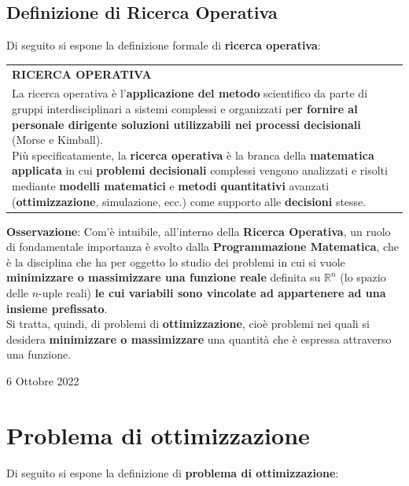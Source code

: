 \documentclass[a4paper]{extarticle}
\renewcommand\arraystretch{}
\begin{document}
\vspace{1em}
\noindent
\subsection{Definizione di Ricerca Operativa}
Di seguito si espone la definizione formale di \textbf{ricerca operativa}:

\vspace{1em}
\setlength{\tabcolsep}{14pt}
\renewcommand{\arraystretch}{2}
\noindent
\begin{tabularx}{\textwidth}{@{}|P|@{}}
    \hline
    {\textbf{RICERCA OPERATIVA}}\\
    \parbox{\linewidth}{La ricerca operativa è l'\textbf{applicazione del metodo} scientifico da parte di gruppi interdisciplinari a sistemi complessi e organizzati p\textbf{er fornire al personale dirigente soluzioni utilizzabili nei processi decisionali} (Morse e Kimball).\\
    Più specificatamente, la \textbf{ricerca operativa} è la branca della \textbf{matematica applicata} in cui \textbf{problemi decisionali} complessi vengono analizzati e risolti mediante \textbf{modelli matematici} e \textbf{metodi quantitativi} avanzati (\textbf{ottimizzazione}, simulazione, ecc.) come supporto alle \textbf{decisioni} stesse. \vspace{3mm}}\\
    \hline
\end{tabularx}

\vspace{2em}
\noindent
\textbf{Osservazione}: Com'è intuibile, all'interno della \textbf{Ricerca Operativa}, un ruolo di fondamentale importanza è svolto dalla \textbf{Programmazione Matematica}, che è la disciplina che ha per oggetto lo studio dei problemi in cui si vuole \textbf{minimizzare o massimizzare una funzione reale} definita su $\mathbb{R}^n$ (lo spazio delle $n$-uple reali) \textbf{le cui variabili sono vincolate ad appartenere ad una insieme prefissato}.\\
Si tratta, quindi, di problemi di \textbf{ottimizzazione}, cioè problemi nei quali si desidera \textbf{minimizzare o massimizzare} una quantità che è espressa attraverso una funzione.

\newpage
\begin{center}
    6 Ottobre 2022
\end{center}
\section{Problema di ottimizzazione}
Di seguito si espone la definizione di \textbf{problema di ottimizzazione}:
\end{document}
